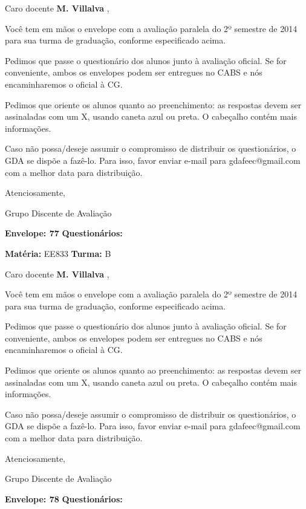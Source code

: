 \documentclass[a5paper]{letter}
\begin{document}
Caro docente {\bf M. Villalva }, 

	Você tem em mãos o envelope com a avaliação paralela do 2º semestre de 2014 para sua turma de graduação, conforme especificado acima.

	Pedimos que passe o questionário dos alunos junto à avaliação oficial. Se for conveniente, ambos os envelopes podem ser entregues no CABS e nós encaminharemos o oficial à CG.

Pedimos que oriente os alunos quanto ao preenchimento: as respostas devem ser assinaladas com um X, usando caneta azul ou preta. O cabeçalho contém mais informações.

	Caso não possa/deseje assumir o compromisso de distribuir os questionários, o GDA se dispõe a fazê-lo. Para isso, favor enviar e-mail para gdafeec@gmail.com com a melhor data para distribuição.


Atenciosamente, 

Grupo Discente de Avaliação

\vspace{0.5cm}

{\bf Envelope: 77 }		\hfill	{\bf Questionários:} \hspace{2cm}

\newpage
\thispagestyle{empty}

\hfill {\bf Matéria:} EE833 {\bf Turma:} B

Caro docente {\bf M. Villalva }, 

	Você tem em mãos o envelope com a avaliação paralela do 2º semestre de 2014 para sua turma de graduação, conforme especificado acima.

	Pedimos que passe o questionário dos alunos junto à avaliação oficial. Se for conveniente, ambos os envelopes podem ser entregues no CABS e nós encaminharemos o oficial à CG.

Pedimos que oriente os alunos quanto ao preenchimento: as respostas devem ser assinaladas com um X, usando caneta azul ou preta. O cabeçalho contém mais informações.

	Caso não possa/deseje assumir o compromisso de distribuir os questionários, o GDA se dispõe a fazê-lo. Para isso, favor enviar e-mail para gdafeec@gmail.com com a melhor data para distribuição.


Atenciosamente, 

Grupo Discente de Avaliação

\vspace{0.5cm}

{\bf Envelope: 78 }		\hfill	{\bf Questionários:} \hspace{2cm}
\end{document}
